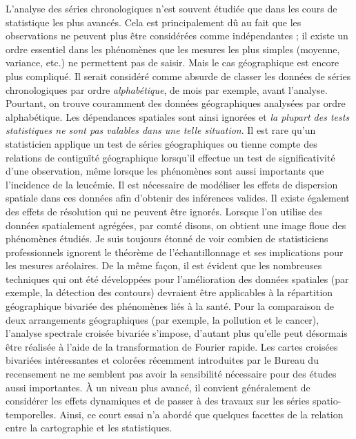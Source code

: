 \documentclass[a4paper,11pt]{article}
\begin{document}
L'analyse des séries chronologiques n'est souvent étudiée que dans les cours de statistique les plus avancés. Cela est principalement dû au fait que les observations ne peuvent plus être considérées comme indépendantes ; il existe un ordre essentiel dans les phénomènes que les mesures les plus simples (moyenne, variance, etc.) ne permettent pas de saisir. Mais le cas géographique est encore plus compliqué. Il serait considéré comme absurde de classer les données de séries chronologiques par ordre \emph{alphabétique}, de mois par exemple, avant l'analyse. Pourtant, on trouve couramment des données géographiques analysées par ordre alphabétique. Les dépendances spatiales sont ainsi ignorées et \emph{la plupart des tests statistiques ne sont pas valables dans une telle situation}. Il est rare qu'un statisticien applique un test de \og  séries \fg{} géographiques ou tienne compte des relations de contiguïté géographique lorsqu'il effectue un test de \og significativité \fg{} d'une observation, même lorsque les phénomènes sont aussi importants que l'incidence de la leucémie. Il est nécessaire de modéliser les effets de dispersion spatiale dans ces données afin d'obtenir des inférences valides. Il existe également des effets de résolution qui ne peuvent être ignorés. Lorsque l'on utilise des données spatialement agrégées, par comté disons, on obtient une image floue des phénomènes étudiés. Je suis toujours étonné de voir combien de statisticiens professionnels ignorent le théorème de l'échantillonnage et ses implications pour les mesures aréolaires. De la même façon, il est évident que les nombreuses techniques qui ont été développées pour l'amélioration des données spatiales (par exemple, la détection des contours) devraient être applicables à la répartition géographique bivariée des phénomènes liés à la santé. Pour la comparaison de deux arrangements géographiques (par exemple, la pollution et le cancer), l'analyse spectrale croisée bivariée s'impose, d'autant plus qu'elle peut désormais être réalisée à l'aide de la transformation de Fourier rapide. Les cartes croisées bivariées intéressantes et colorées récemment introduites par le Bureau du recensement ne me semblent pas avoir la sensibilité nécessaire pour des études aussi importantes. À un niveau plus avancé, il convient généralement de considérer les effets dynamiques et de passer à des travaux sur les séries spatio-temporelles. Ainsi, ce court essai n'a abordé que quelques facettes de la relation entre la cartographie et les statistiques.

\bigskip
\end{document}
